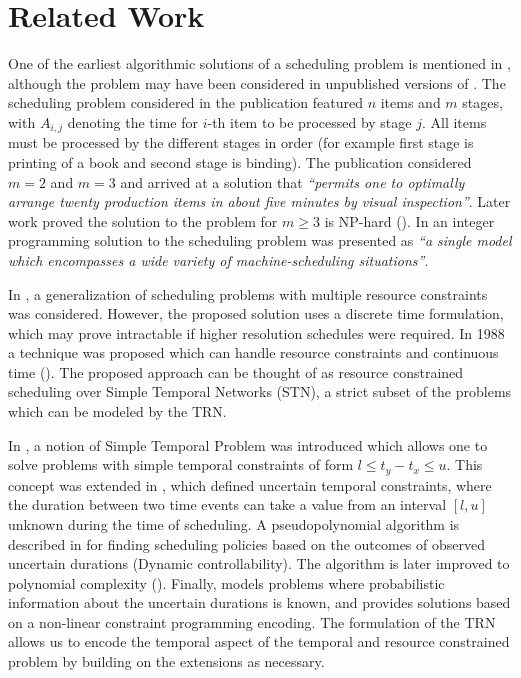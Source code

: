 \section{Related Work}
One of the earliest algorithmic solutions of a scheduling problem is mentioned in \cite{johnson1954optimal}, although the problem may have been considered in unpublished versions of \cite{bellman1956mathematical}. The scheduling problem considered in the publication featured $n$ items and $m$ stages, with $A_{i,j}$ denoting the time for $i$-th item to be processed by stage $j$. All items must be processed by the different stages in order (for example first stage is printing of a book and second stage is binding). The publication considered $m=2$ and $m=3$ and arrived at a solution that \textit{``permits one to optimally arrange twenty production items in about five minutes by visual inspection''}. Later work proved the solution to the problem for $m \geq 3$ is NP-hard (\cite{garey1976complexity}). In \cite{wagner1959integer} an integer programming solution to the scheduling problem was presented as \textit{``a single model which encompasses a wide variety of machine-scheduling situations''}.

In \cite{pritsker1969multiproject}, a generalization of scheduling problems with multiple resource constraints was considered. However, the proposed solution uses a discrete time formulation, which may prove intractable if higher resolution schedules were required. In 1988 a technique was proposed which can handle resource constraints and continuous time (\cite{bartusch1988scheduling}). The proposed approach can be thought of as resource constrained scheduling over Simple Temporal Networks (STN), a strict subset of the problems which can be modeled by the TRN.

In \cite{dechter1991temporal}, a notion of Simple Temporal Problem was introduced which allows one to solve problems with simple temporal constraints of form $l \leq t_y - t_x \leq u$. This concept was extended in \cite{vidal1996dealing}, which defined uncertain temporal constraints, where the duration between two time events can take a value from an interval $[l,u]$ unknown during the time of scheduling. A pseudopolynomial algorithm is described in \cite{morris2001dynamic} for finding scheduling policies based on the outcomes of observed uncertain durations (Dynamic controllability). The algorithm is later improved to polynomial complexity (\cite{morris2005temporal}). Finally, \cite{Fang2014} models problems where probabilistic information about the uncertain durations is known, and provides solutions based on a non-linear constraint programming encoding. The formulation of the TRN allows us to encode the temporal aspect of the temporal and resource constrained problem by building on the extensions as necessary. 
